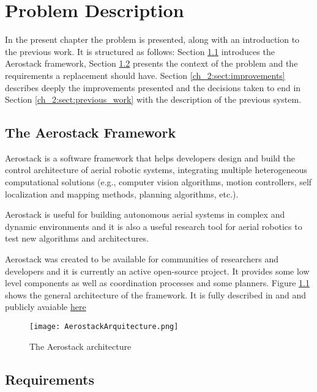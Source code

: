 \chapter{Problem Description}

In the present chapter the problem is presented, along with an introduction to the previous work. It is structured as follows: Section \ref{ch_2:sect:aerostack} introduces the Aerostack framework, Section \ref{ch_2:sect:requirements} presents the context of the problem and the requirements a replacement should have. Section \ref{ch_2:sect:improvements} describes deeply the improvements presented and the decisions taken to end in Section \ref{ch_2:sect:previous_work} with the description of the previous system.

  \section{The Aerostack Framework} \label{ch_2:sect:aerostack}

    Aerostack is a software framework that helps developers design and build the control architecture of aerial robotic systems, integrating multiple heterogeneous computational solutions (e.g., computer vision algorithms, motion controllers, self localization and mapping methods, planning algorithms, etc.).

    Aerostack is useful for building autonomous aerial systems in complex and dynamic environments and it is also a useful research tool for aerial robotics to test new algorithms and architectures.

    Aerostack was created to be available for communities of researchers and developers and it is currently an active open-source project. It provides some low level components as well as coordination processes and some planners. Figure \ref{ch_2:fig:aerostack_arqu} shows the general architecture of the framework. It is fully described in \cite{7502591} and \cite{Sanchez-Lopez2017} and publicly avaiable \href{https://github.com/Vision4UAV/Aerostack/wiki}{here}

    \begin{figure}[ht]
      \centering
      \texttt{[image: AerostackArquitecture.png]}
      \caption{The Aerostack architecture}
      \label{ch_2:fig:aerostack_arqu}
    \end{figure}

  \section{Requirements} \label{ch_2:sect:requirements}

